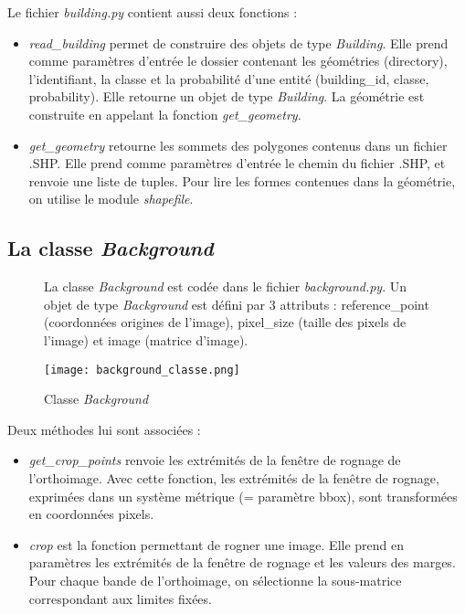 \noindent Le fichier \textit{building.py} contient aussi deux fonctions :
\begin{itemize}[label=$\rightarrow$]
	\item \textit{read\_building} permet de construire des objets de type \textit{Building}. Elle prend comme paramètres d'entrée le dossier contenant les géométries (directory), l'identifiant, la classe et la probabilité d'une entité (building\_id, classe, probability). Elle retourne un objet de type \textit{Building}. La géométrie est construite en appelant la fonction \textit{get\_geometry}.
	\item \textit{get\_geometry} retourne les sommets des polygones contenus dans un fichier .SHP. Elle prend comme paramètres d'entrée le chemin du fichier .SHP, et renvoie une liste de tuples. Pour lire les formes contenues dans la géométrie, on utilise le module \textit{shapefile}.\\
\end{itemize}

\subsection{La classe \textit{Background}}

\begin{figure}[!h]
	\begin{minipage}{0.55\linewidth}\parindent12pt
		\indent La classe \textit{Background} est codée dans le fichier \textit{background.py}. Un objet de type \textit{Background} est défini par 3 attributs : reference\_point (coordonnées origines de l'image), pixel\_size (taille des pixels de l'image) et image (matrice d'image).\\
	\end{minipage}
	\hfill
	\begin{minipage}{0.45\linewidth}
		\centering
		\texttt{[image: background\_classe.png]}  \\
		\caption[Classe \textit{Background}]{Classe \textit{Background}}
		\label{fig:classeback}
	\end{minipage}
\end{figure}

\noindent Deux méthodes lui sont associées : 
\begin{itemize}[label=$\rightarrow$]
	\item \textit{get\_crop\_points} renvoie les extrémités de la fenêtre de rognage de l'orthoimage. Avec cette fonction, les extrémités de la fenêtre de rognage, exprimées dans un système métrique (= paramètre bbox), sont transformées en coordonnées pixels. 
	\item \textit{crop} est la fonction permettant de rogner une image. Elle prend en paramètres les extrémités de la fenêtre de rognage et les valeurs des marges. Pour chaque bande de l'orthoimage, on sélectionne la sous-matrice correspondant aux limites fixées. 
\end{itemize}

